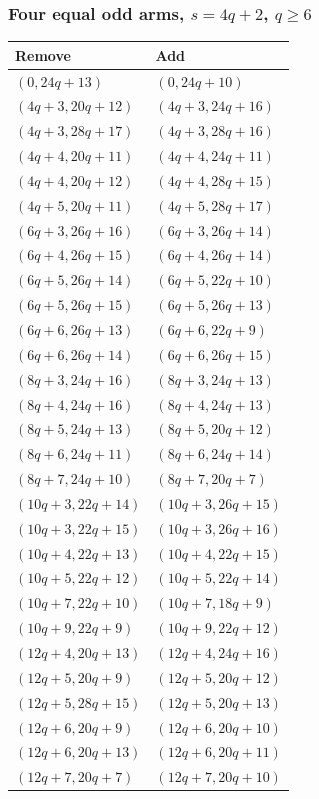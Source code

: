 \subsubsection[Four equal odd arms, s=4q+2, q >= 6]{Four equal odd arms, $s=4q+2$, $q\ge6$}
\label{templates:four-r2}
\begingroup\small
\begin{longtable}{ll}
Remove & Add\\\hline\endhead
$(0,24q+13)$ & $(0,24q+10)$\\
$(4q+3,20q+12)$ & $(4q+3,24q+16)$\\
$(4q+3,28q+17)$ & $(4q+3,28q+16)$\\
$(4q+4,20q+11)$ & $(4q+4,24q+11)$\\
$(4q+4,20q+12)$ & $(4q+4,28q+15)$\\
$(4q+5,20q+11)$ & $(4q+5,28q+17)$\\
$(6q+3,26q+16)$ & $(6q+3,26q+14)$\\
$(6q+4,26q+15)$ & $(6q+4,26q+14)$\\
$(6q+5,26q+14)$ & $(6q+5,22q+10)$\\
$(6q+5,26q+15)$ & $(6q+5,26q+13)$\\
$(6q+6,26q+13)$ & $(6q+6,22q+9)$\\
$(6q+6,26q+14)$ & $(6q+6,26q+15)$\\
$(8q+3,24q+16)$ & $(8q+3,24q+13)$\\
$(8q+4,24q+16)$ & $(8q+4,24q+13)$\\
$(8q+5,24q+13)$ & $(8q+5,20q+12)$\\
$(8q+6,24q+11)$ & $(8q+6,24q+14)$\\
$(8q+7,24q+10)$ & $(8q+7,20q+7)$\\
$(10q+3,22q+14)$ & $(10q+3,26q+15)$\\
$(10q+3,22q+15)$ & $(10q+3,26q+16)$\\
$(10q+4,22q+13)$ & $(10q+4,22q+15)$\\
$(10q+5,22q+12)$ & $(10q+5,22q+14)$\\
$(10q+7,22q+10)$ & $(10q+7,18q+9)$\\
$(10q+9,22q+9)$ & $(10q+9,22q+12)$\\
$(12q+4,20q+13)$ & $(12q+4,24q+16)$\\
$(12q+5,20q+9)$ & $(12q+5,20q+12)$\\
$(12q+5,28q+15)$ & $(12q+5,20q+13)$\\
$(12q+6,20q+9)$ & $(12q+6,20q+10)$\\
$(12q+6,20q+13)$ & $(12q+6,20q+11)$\\
$(12q+7,20q+7)$ & $(12q+7,20q+10)$\\

\end{longtable}
